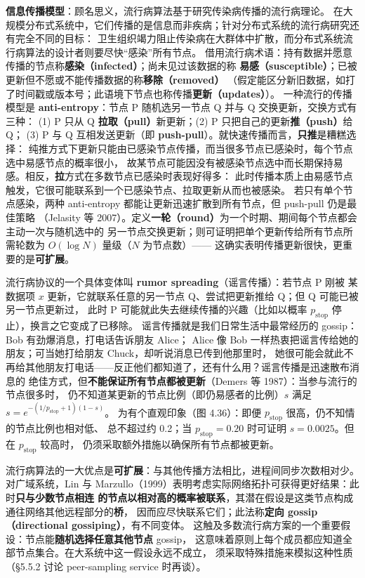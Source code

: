 \medskip\noindent\textbf{信息传播模型}：顾名思义，流行病算法基于研究传染病传播的流行病理论。
在大规模分布式系统中，它们传播的是信息而非疾病；针对分布式系统的流行病研究还有完全不同的目标：
卫生组织竭力阻止传染病在大群体中扩散，而分布式系统流行病算法的设计者则要尽快“感染”所有节点。
借用流行病术语：持有数据并愿意传播的节点称\textbf{感染（infected）}；尚未见过该数据的称
\textbf{易感（susceptible）}；已被更新但不愿或不能传播数据的称\textbf{移除（removed）}
（假定能区分新旧数据，如打了时间戳或版本号；此语境下节点也称传播\textbf{更新（updates）}）。
一种流行的传播模型是 \textbf{anti-entropy}：节点 P 随机选另一节点 Q 并与 Q 交换更新，交换方式有三种：
(1) P 只从 Q \textbf{拉取（pull）}新更新；(2) P 只把自己的更新\textbf{推（push）}给 Q；
(3) P 与 Q 互相发送更新（即 \textbf{push-pull}）。就快速传播而言，\textbf{只推}是糟糕选择：
纯推方式下更新只能由已感染节点传播，而当很多节点已感染时，每个节点选中易感节点的概率很小，
故某节点可能因没有被感染节点选中而长期保持易感。相反，\textbf{拉}方式在多数节点已感染时表现好得多：
此时传播本质上由易感节点触发，它很可能联系到一个已感染节点、拉取更新从而也被感染。
若只有单个节点感染，两种 anti-entropy 都能让更新迅速扩散到所有节点，但 push-pull 仍是最佳策略
（Jelasity 等 2007）。定义\textbf{一轮（round）}为一个时期、期间每个节点都会主动一次与随机选中的
另一节点交换更新；则可证明把单个更新传给所有节点所需轮数为 $O(\log N)$ 量级（$N$ 为节点数）——
这确实表明传播更新很快，更重要的是\textbf{可扩展}。

\medskip\noindent 流行病协议的一个具体变体叫 \textbf{rumor spreading}（谣言传播）：若节点 P 刚被
某数据项 $x$ 更新，它就联系任意的另一节点 Q、尝试把更新推给 Q；但 Q 可能已被另一节点更新过，
此时 P 可能就此失去继续传播的兴趣（比如以概率 $p_{\text{stop}}$ 停止），换言之它变成了已移除。
谣言传播就是我们日常生活中最常经历的 gossip：Bob 有劲爆消息，打电话告诉朋友 Alice；
Alice 像 Bob 一样热衷把谣言传给她的朋友；可当她打给朋友 Chuck，却听说消息已传到他那里时，
她很可能会就此不再给其他朋友打电话——反正他们都知道了，还有什么用？谣言传播是迅速散布消息的
绝佳方式，但\textbf{不能保证所有节点都被更新}（Demers 等 1987）：当参与流行的节点很多时，
仍不知道某更新的节点比例（即仍易感者的比例）$s$ 满足 $s=e^{-(1/p_{\text{stop}}+1)(1-s)}$。
为有个直观印象（图 4.36）：即便 $p_{\text{stop}}$ 很高，仍不知情的节点比例也相对低、
总不超过约 0.2；当 $p_{\text{stop}}=0.20$ 时可证明 $s=0.0025$。但在 $p_{\text{stop}}$ 较高时，
仍须采取额外措施以确保所有节点都被更新。

\medskip\noindent 流行病算法的一大优点是\textbf{可扩展}：与其他传播方法相比，进程间同步次数相对少。
对广域系统，Lin 与 Marzullo（1999）表明考虑实际网络拓扑可获得更好结果：此时\textbf{只与少数节点相连
的节点以相对高的概率被联系}，其潜在假设是这类节点构成通往网络其他远程部分的\textbf{桥}，
因而应尽快联系它们；此法称\textbf{定向 gossip（directional gossiping）}，有不同变体。
这触及多数流行病方案的一个重要假设：节点能\textbf{随机选择任意其他节点} gossip，
这意味着原则上每个成员都应知道全部节点集合。在大系统中这一假设永远不成立，
须采取特殊措施来模拟这种性质（§5.5.2 讨论 peer-sampling service 时再谈）。

